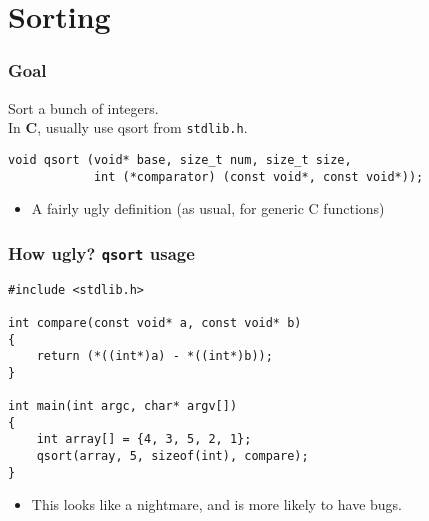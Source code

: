 \section{Sorting}
\begin{frame}[fragile]
  \frametitle{Goal}


  
  Sort a bunch of integers.\\[1em]
  In {\bf C}, usually use qsort from {\tt stdlib.h}.

  \begin{lstlisting}
void qsort (void* base, size_t num, size_t size,
            int (*comparator) (const void*, const void*));
  \end{lstlisting}

  \begin{itemize}
    \item A fairly ugly definition (as usual, for generic C functions)
  \end{itemize}
  
\end{frame}

\begin{frame}[fragile]
  \frametitle{How ugly? {\tt qsort} usage}

  
  \begin{lstlisting}
#include <stdlib.h>

int compare(const void* a, const void* b)
{
    return (*((int*)a) - *((int*)b));
}

int main(int argc, char* argv[])
{
    int array[] = {4, 3, 5, 2, 1};
    qsort(array, 5, sizeof(int), compare);
}
  \end{lstlisting}

  \begin{itemize}
    \item This looks like a nightmare, and is more likely to have bugs.
  \end{itemize}
  
\end{frame}

